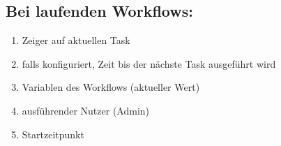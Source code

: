         \subsection{Bei laufenden Workflows:}
            \begin{enumerate}[font={\bfseries}, label={PD2\arabic*}0, wide=0pt, labelindent=1em, leftmargin=*]
                \item Zeiger auf aktuellen Task
                \item falls konfiguriert, Zeit bis der nächste Task ausgeführt wird
                \item Variablen des Workflows (aktueller Wert)
                \item ausführender Nutzer (Admin)
                \item Startzeitpunkt
            \end{enumerate}

